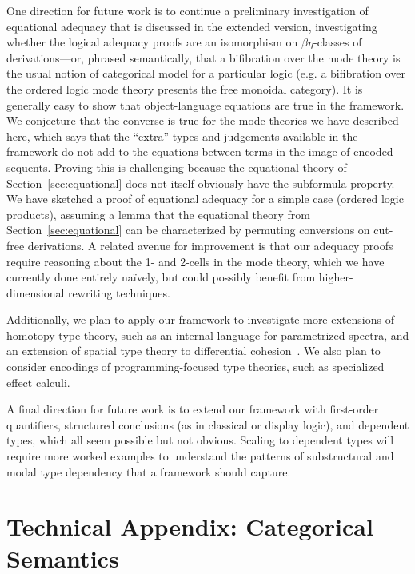 \documentclass[a4paper,USenglish,numberwithinsect]{lipics-v2016}
\begin{document}
One direction for future work is to continue a preliminary investigation
of equational adequacy that is discussed in the extended version,
investigating whether the logical adequacy proofs are an isomorphism on
$\beta\eta$-classes of derivations---or, phrased semantically, that a
bifibration over the mode theory is the usual notion of categorical
model for a particular logic (e.g. a bifibration over the ordered logic
mode theory presents the free monoidal category).  It is generally easy
to show that object-language equations are true in the framework.  We
conjecture that the converse is true for the mode theories we have
described here, which says that the ``extra'' types and judgements
available in the framework do not add to the equations between terms in
the image of encoded sequents.  Proving this is challenging because the
equational theory of Section~\ref{sec:equational} does not itself
obviously have the subformula property.  We have sketched a proof of
equational adequacy for a simple case (ordered logic products), assuming
a lemma that the equational theory from Section~\ref{sec:equational} can
be characterized by permuting conversions on cut-free derivations.  A
related avenue for improvement is that our adequacy proofs require
reasoning about the 1- and 2-cells in the mode theory, which we have
currently done entirely na\"ively, but could possibly benefit from
higher-dimensional rewriting techniques.

Additionally, we plan to apply our framework to investigate more
extensions of homotopy type theory, such as an internal language for
parametrized spectra, and an extension of spatial type theory to
differential cohesion~\cite{schreiber13differential}.  We also plan to
consider encodings of programming-focused type theories, such as
specialized effect calculi.

A final direction for future work is to extend our framework with
first-order quantifiers, structured conclusions (as in classical or
display logic), and dependent types, which all seem possible but not
obvious.  Scaling to dependent types will require more worked examples
to understand the patterns of substructural and modal type dependency
that a framework should capture.  




\appendix

\section{Technical Appendix: Categorical Semantics}
\end{document}
